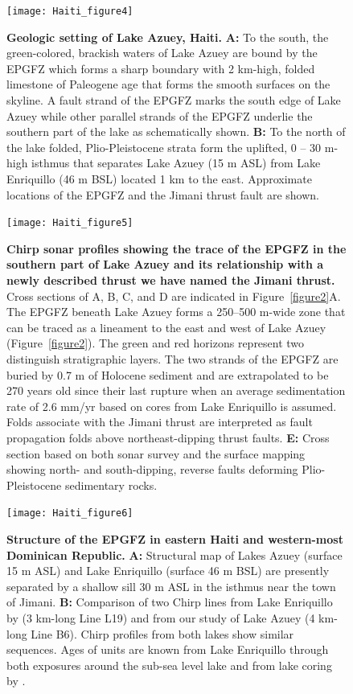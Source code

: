 \documentclass[linenumbers,draft]{agujournal}
\begin{document}
\begin{figure}
\centering
\texttt{[image: Haiti\_figure4]}
\caption{\textbf{Geologic setting of Lake Azuey, Haiti.} \textbf{A:} To the south, the green-colored, brackish waters of Lake Azuey are bound by the EPGFZ which forms a sharp boundary with 2 km-high, folded limestone of Paleogene age that forms the smooth surfaces on the skyline. A fault strand of the EPGFZ marks the south edge of Lake Azuey while other parallel strands of the EPGFZ underlie the southern part of the lake as schematically shown. \textbf{B:} To the north of the lake folded, Plio-Pleistocene strata form the uplifted, 0 -- 30 m-high isthmus that separates Lake Azuey (15 m ASL) from Lake Enriquillo (46 m BSL) located 1 km to the east. Approximate locations of the EPGFZ and the Jimani thrust fault are shown.}
\label{figure4}
\end{figure}

\begin{figure}
\centering
\texttt{[image: Haiti\_figure5]}
\caption{\textbf{Chirp sonar profiles showing the trace of the EPGFZ in the southern part of Lake Azuey and its relationship with a newly described thrust we have named the Jimani thrust.} Cross sections of A, B, C, and D are indicated in Figure~\ref{figure2}A. The EPGFZ beneath Lake Azuey forms a 250--500 m-wide zone that can be traced as a lineament to the east and west of Lake Azuey (Figure~\ref{figure2}). The green and red horizons represent two distinguish stratigraphic layers. The two strands of the EPGFZ are buried by 0.7 m of Holocene sediment and are extrapolated to be 270 years old since their last rupture when an average sedimentation rate of 2.6 mm/yr based on cores from Lake Enriquillo is assumed. Folds associate with the Jimani thrust are interpreted as fault propagation folds above northeast-dipping thrust faults. \textbf{E:} Cross section based on both sonar survey and the surface mapping \citep{mann1991overview} showing north- and south-dipping, reverse faults deforming Plio-Pleistocene sedimentary rocks.}
\label{figure5}
\end{figure}

\begin{figure}
\centering
\texttt{[image: Haiti\_figure6]}
\caption{\textbf{Structure of the EPGFZ in eastern Haiti and western-most Dominican Republic.} \textbf{A:} Structural map of Lakes Azuey (surface 15 m ASL) and Lake Enriquillo (surface 46 m BSL) are presently separated by a shallow sill 30 m ASL in the isthmus near the town of Jimani. \textbf{B:} Comparison of two Chirp lines from Lake Enriquillo by \citet{rios2013holocene} (3 km-long Line L19) and from our study of Lake Azuey (4 km-long Line B6). Chirp profiles from both lakes show similar sequences. Ages of units are known from Lake Enriquillo through both exposures around the sub-sea level lake and from lake coring by \citet{rios2013holocene}.}
\label{figure6}
\end{figure}
\end{document}

